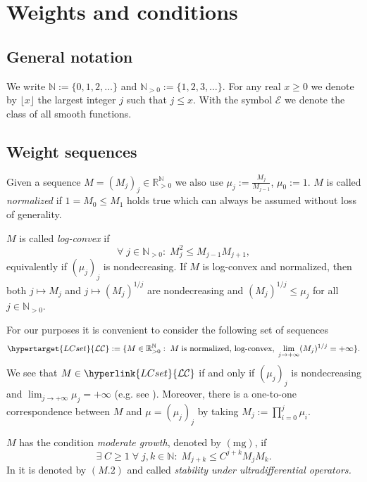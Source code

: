 \documentclass[10pt]{amsart}%
\numberwithin{equation}{section}
\theoremstyle{plain}
\newcommand{\RR}{\mathbb{R}}
\newcommand{\NN}{\mathbb{N}}
\let\on=\operatorname
\begin{document}
\section{Weights and conditions}\label{weightsandcond}
\subsection{General notation}
We write $\NN:=\{0,1,2,\dots\}$ and $\NN_{>0}:=\{1,2,3,\dots\}$.  For any real $x\ge 0$ we denote by $\lfloor x\rfloor$ the largest integer $j$ such that $j\le x$. With the symbol $\mathcal{E}$ we denote the class of all smooth functions.

\subsection{Weight sequences}\label{weightsequences}
Given a sequence $M=(M_j)_j\in\RR_{>0}^{\NN}$ we also use $\mu_j:=\frac{M_j}{M_{j-1}}$, $\mu_0:=1$. $M$ is called {\itshape normalized} if $1=M_0\le M_1$ holds true which can always be assumed without loss of generality.


$M$ is called {\itshape log-convex} if
$$\forall\;j\in\NN_{>0}:\;M_j^2\le M_{j-1} M_{j+1},$$
equivalently if $(\mu_j)_j$ is nondecreasing. If $M$ is log-convex and normalized, then both $j\mapsto M_j$ and $j\mapsto(M_j)^{1/j}$ are nondecreasing and $(M_j)^{1/j}\le\mu_j$ for all $j\in\NN_{>0}$.

For our purposes it is convenient to consider the following set of sequences
$$\hypertarget{LCset}{\mathcal{LC}}:=\{M\in\RR_{>0}^{\NN}:\;M\;\text{is normalized, log-convex},\;\lim_{j\rightarrow+\infty}(M_j)^{1/j}=+\infty\}.$$
We see that $M\in\hyperlink{LCset}{\mathcal{LC}}$ if and only if $(\mu_j)_j$ is nondecreasing and $\lim_{j\rightarrow+\infty}\mu_j=+\infty$ (e.g. see \cite[p. 104]{compositionpaper}). Moreover, there is a one-to-one correspondence between $M$ and $\mu=(\mu_j)_j$ by taking $M_j:=\prod_{i=0}^j\mu_i$.\vspace{6pt}

$M$ has the condition {\itshape moderate growth}, denoted by \hypertarget{mg}{$(\text{mg})$}, if
$$\exists\;C\ge 1\;\forall\;j,k\in\NN:\;M_{j+k}\le C^{j+k} M_j M_k.$$
In \cite{Komatsu73} it is denoted by $(M.2)$ and called {\itshape stability under ultradifferential operators.} %
\end{document}
